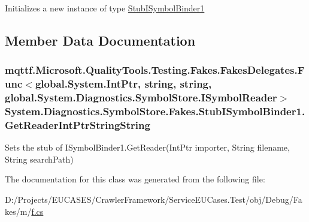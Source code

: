 Initializes a new instance of type \hyperlink{class_system_1_1_diagnostics_1_1_symbol_store_1_1_fakes_1_1_stub_i_symbol_binder1}{Stub\-I\-Symbol\-Binder1}



\subsection{Member Data Documentation}
\hypertarget{class_system_1_1_diagnostics_1_1_symbol_store_1_1_fakes_1_1_stub_i_symbol_binder1_a36825d96d6c914396f0a5d8483a58c45}{
\subsubsection[{Get\-Reader\-Int\-Ptr\-String\-String}]{\setlength{\rightskip}{0pt plus 5cm}mqttf.\-Microsoft.\-Quality\-Tools.\-Testing.\-Fakes.\-Fakes\-Delegates.\-Func$<$global.\-System.\-Int\-Ptr, string, string, global.\-System.\-Diagnostics.\-Symbol\-Store.\-I\-Symbol\-Reader$>$ System.\-Diagnostics.\-Symbol\-Store.\-Fakes.\-Stub\-I\-Symbol\-Binder1.\-Get\-Reader\-Int\-Ptr\-String\-String}}\label{class_system_1_1_diagnostics_1_1_symbol_store_1_1_fakes_1_1_stub_i_symbol_binder1_a36825d96d6c914396f0a5d8483a58c45}


Sets the stub of I\-Symbol\-Binder1.\-Get\-Reader(\-Int\-Ptr importer, String filename, String search\-Path)



The documentation for this class was generated from the following file\-:\begin{DoxyCompactItemize}
\item 
D\-:/\-Projects/\-E\-U\-C\-A\-S\-E\-S/\-Crawler\-Framework/\-Service\-E\-U\-Cases.\-Test/obj/\-Debug/\-Fakes/m/\hyperlink{m_2f_8cs}{f.\-cs}\end{DoxyCompactItemize}
